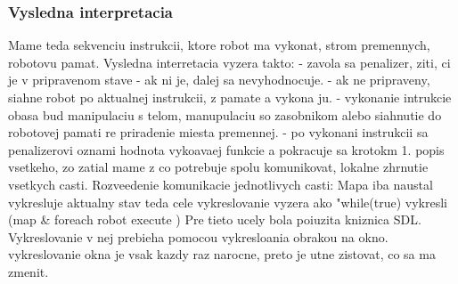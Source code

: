 \documentclass[a4paper,11pt,final]{report}
\begin{document}
\subsubsection{Vysledna interpretacia}
Mame teda sekvenciu instrukcii, ktore robot ma vykonat, strom premennych, robotovu pamat. Vysledna interretacia vyzera takto:
- zavola sa penalizer, ziti, ci je v pripravenom stave
- ak ni je, dalej sa nevyhodnocuje.
- ak ne pripraveny, siahne robot po aktualnej instrukcii, z pamate a vykona ju.
- vykonanie intrukcie obasa bud manipulaciu s telom, manupulaciu so zasobnikom alebo siahnutie do robotovej pamati re priradenie miesta premennej.
- po vykonani instrukcii sa penalizerovi oznami hodnota vykoavaej funkcie a pokracuje sa krotokm 1.
popis vsetkeho, zo zatial mame z co potrebuje spolu komunikovat, lokalne zhrnutie vsetkych casti. Rozveedenie komunikacie jednotlivych casti:
Mapa iba naustal vykresluje aktualny stav teda cele vykreslovanie vyzera ako "while(true) vykresli (map \& foreach robot execute )
Pre tieto ucely bola poiuzita kniznica SDL. Vykreslovanie v nej prebieha pomocou vykresloania obrakou na okno. vykreslovanie okna je vsak kazdy raz narocne, preto je utne zistovat, co sa ma zmenit.
\end{document}
